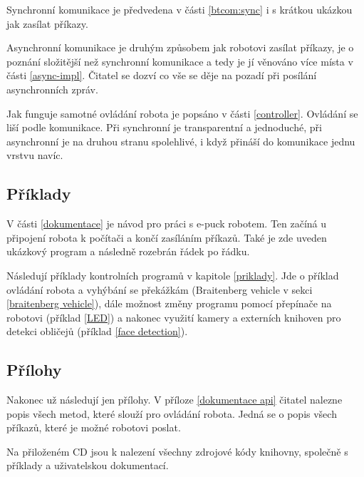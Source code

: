 Synchronní komunikace je předvedena v části \ref{btcom:sync} i s krátkou
ukázkou jak zasílat příkazy.

Asynchronní komunikace je druhým způsobem jak robotovi zasílat příkazy, je
o poznání složitější než synchronní komunikace a tedy je jí věnováno více
místa v části \ref{async-impl}. Čitatel se dozví co vše se děje na pozadí
při posílání asynchronních zpráv.

Jak funguje samotné ovládání robota je popsáno v části \ref{controller}.
Ovládání se liší podle komunikace. Při synchronní je transparentní a
jednoduché, při asynchronní je na druhou stranu spolehlivé, i když přináší
do komunikace jednu vrstvu navíc.

\subsection*{Příklady}

V části \ref{dokumentace} je návod pro práci s e-puck robotem. Ten začíná u
připojení robota k počítači a končí zasíláním příkazů. Také je zde uveden
ukázkový program a následně rozebrán řádek po řádku.

Následují příklady kontrolních programů v kapitole \ref{priklady}. Jde o
příklad ovládání robota a vyhýbání se překážkám (Braitenberg vehicle v
sekci \ref{braitenberg vehicle}), dále možnost změny programu pomocí
přepínače na robotovi (příklad \ref{LED}) a nakonec využití kamery a
externích knihoven pro detekci obličejů (příklad \ref{face detection}).

\subsection*{Přílohy}

Nakonec už následují jen přílohy. V příloze \ref{dokumentace api} čitatel
nalezne popis všech metod, které slouží pro ovládání robota. Jedná se o
popis všech příkazů, které je možné robotovi poslat.

Na přiloženém CD jsou k nalezení všechny zdrojové kódy knihovny, společně s
příklady a uživatelskou dokumentací.
